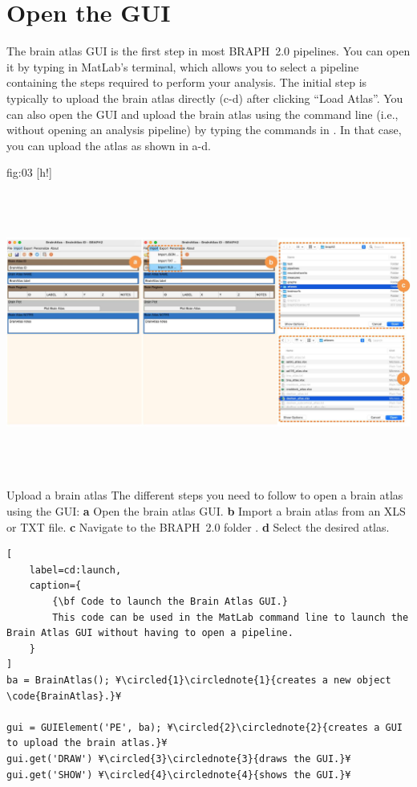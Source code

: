 \documentclass[justified]{tufte-handout}
\begin{document}
\clearpage
\section{Open the GUI}

The brain atlas GUI is the first step in most BRAPH~2.0 pipelines. You can open it by typing  in MatLab's terminal, which allows you to select a pipeline containing the steps required to perform your analysis. The initial step is typically to upload the brain atlas directly (c-d) after clicking ``Load Atlas''. You can also open the GUI and upload the brain atlas using the command line (i.e., without opening an analysis pipeline) by typing the commands in . In that case, you can upload the atlas as shown in a-d.

	{fig:03}
	{
	[h!]
	\includegraphics[height=10cm]{fig03.jpg}
	}
	{Upload a brain atlas}
	{
	The different steps you need to follow to open a brain atlas using the GUI: 
	{\bf a} Open the brain atlas GUI.
	{\bf b} Import a brain atlas from an XLS or TXT file.
	{\bf c} Navigate to the BRAPH~2.0 folder .
	{\bf d} Select the desired atlas.
	}

%
\begin{lstlisting}[
	label=cd:launch,
	caption={
		{\bf Code to launch the Brain Atlas GUI.}
		This code can be used in the MatLab command line to launch the  Brain Atlas GUI without having to open a pipeline.
	}
]
ba = BrainAtlas(); ¥\circled{1}\circlednote{1}{creates a new object \code{BrainAtlas}.}¥

gui = GUIElement('PE', ba); ¥\circled{2}\circlednote{2}{creates a GUI to upload the brain atlas.}¥
gui.get('DRAW') ¥\circled{3}\circlednote{3}{draws the GUI.}¥
gui.get('SHOW') ¥\circled{4}\circlednote{4}{shows the GUI.}¥
\end{lstlisting}
\end{document}
